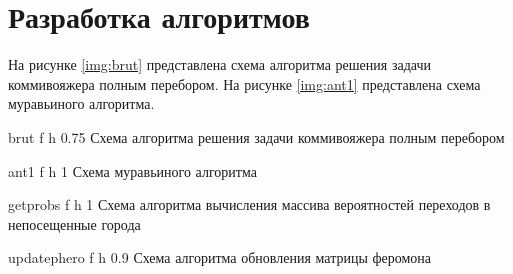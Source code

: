\section{Разработка алгоритмов}

На рисунке \ref{img:brut} представлена схема алгоритма решения задачи коммивояжера полным перебором. На рисунке \ref{img:ant1} представлена схема муравьиного алгоритма. 

\clearpage

{brut} %
{f} %
{h} %
{0.75\textwidth} %
{Схема алгоритма решения задачи коммивояжера полным перебором} %

\clearpage

{ant1} %
{f} %
{h} %
{1\textwidth} %
{Схема муравьиного алгоритма} %


\clearpage

{getprobs} %
{f} %
{h} %
{1\textwidth} %
{Схема алгоритма вычисления массива вероятностей переходов в непосещенные города} %


\clearpage

{updatephero} %
{f} %
{h} %
{0.9\textwidth} %
{Схема алгоритма обновления матрицы феромона} %

